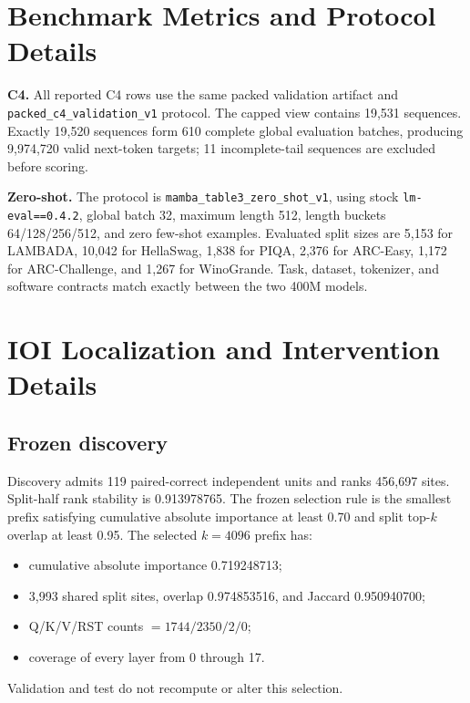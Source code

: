 \documentclass{article}
\newcommand{\smallhead}[1]{\vspace{0.25em}\noindent\textbf{#1}}
\begin{document}
\section{Benchmark Metrics and Protocol Details}
\label{app:benchmarks}

\smallhead{C4.}
All reported C4 rows use the same packed validation artifact and
\texttt{packed\_c4\_validation\_v1} protocol. The capped view contains 19,531
sequences. Exactly 19,520 sequences form 610 complete global evaluation
batches, producing 9,974,720 valid next-token targets; 11 incomplete-tail
sequences are excluded before scoring.

\smallhead{Zero-shot.}
The protocol is \texttt{mamba\_table3\_zero\_shot\_v1}, using stock
\texttt{lm-eval==0.4.2}, global batch 32, maximum length 512, length buckets
64/128/256/512, and zero few-shot examples. Evaluated split sizes are 5,153
for LAMBADA, 10,042 for HellaSwag, 1,838 for PIQA, 2,376 for ARC-Easy, 1,172
for ARC-Challenge, and 1,267 for WinoGrande. Task, dataset, tokenizer, and
software contracts match exactly between the two 400M models.

\section{IOI Localization and Intervention Details}
\label{app:ioi}

\subsection{Frozen discovery}

Discovery admits 119 paired-correct independent units and ranks 456,697 sites.
Split-half rank stability is 0.913978765. The frozen selection rule is the
smallest prefix satisfying cumulative absolute importance at least 0.70 and
split top-\(k\) overlap at least 0.95. The selected \(k=4096\) prefix has:
\begin{itemize}
    \item cumulative absolute importance 0.719248713;
    \item 3,993 shared split sites, overlap 0.974853516, and Jaccard
    0.950940700;
    \item Q/K/V/RST counts \(=1744/2350/2/0\);
    \item coverage of every layer from 0 through 17.
\end{itemize}
Validation and test do not recompute or alter this selection.
\end{document}
